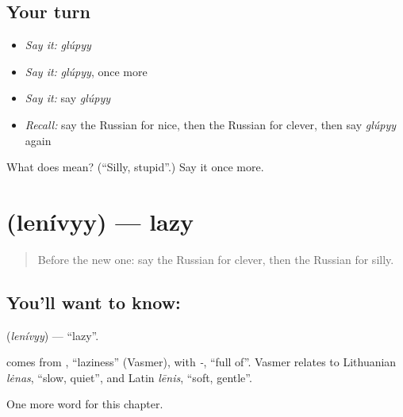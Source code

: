 \subsection*{Your turn}
\begin{itemize}
\raggedright
  \item \emph{Say it:} \emph{glúpyy}
  \item \emph{Say it:} \emph{glúpyy}, once more
  \item \emph{Say it:} say \emph{glúpyy}
  \item \emph{Recall:} say the Russian for nice, then the Russian for clever, then say \emph{glúpyy} again
\end{itemize}

\begin{tcolorbox}[breakable,colback=teal!4,colframe=teal!35!black,title={Before you move on}]
What does  mean? (\textquotedblleft{}Silly, stupid\textquotedblright{}.) Say it once more.
\end{tcolorbox}
\section[\texorpdfstring{\ru{ленивый} (lenívyy)}{ленивый (lenívyy)}]{ (lenívyy) — lazy}

\label{lesson:RU-C155-lenivyy}



\begin{quote}
Before the new one: say the Russian for clever, then the Russian for silly.
\end{quote}

\subsection*{You'll want to know: }
\textbf{} (\emph{lenívyy}) — \textquotedblleft{}lazy\textquotedblright{}.

\begin{cousinweb}
\textbf{} comes from \emph{}, \textquotedblleft{}laziness\textquotedblright{} (Vasmer), with \emph{-}, \textquotedblleft{}full of\textquotedblright{}. Vasmer relates \emph{} to Lithuanian \emph{lėnas}, \textquotedblleft{}slow, quiet\textquotedblright{}, and Latin \emph{lēnis}, \textquotedblleft{}soft, gentle\textquotedblright{}.
\end{cousinweb}

\begin{grammarlens}[title={What you've built}]
One more word for this chapter.
\end{grammarlens}

